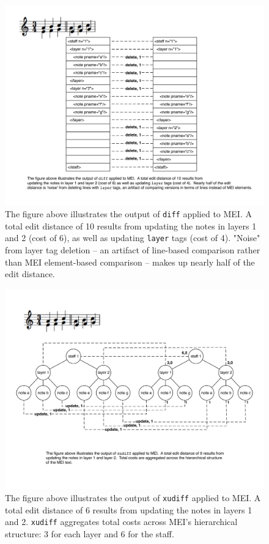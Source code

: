 \documentclass{article}
\begin{document}
\begin{figure}[!htb]
\centering
\includegraphics[width=\textwidth]{figure1.pdf}
\caption{The figure above illustrates the output of \texttt{diff} applied to MEI. A total edit distance of 10 results from updating the notes in layers 1 and 2 (cost of 6), as well as updating \texttt{layer} tags (cost of 4). "Noise" from layer tag deletion -- an artifact of line-based comparison rather than MEI element-based comparison -- makes up nearly half of the edit distance. }
\label{fig:example}
\end{figure}

\begin{figure}[!htb]
\centering
\includegraphics[width=\textwidth]{figure2.pdf}
\caption{The figure above illustrates the output of \texttt{xudiff} applied to MEI. A total edit distance of 6 results from updating the notes in layers 1 and 2. \texttt{xudiff} aggregates total costs across MEI's hierarchical structure: 3 for each layer and 6 for the staff.}
\label{fig:example}
\end{figure}
\end{document}
